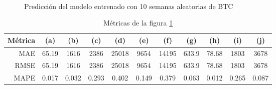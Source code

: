 \documentclass[a4paper,10pt]{article}
\begin{document}
\begin{figure}[h!]
    \\
  \caption{Predicción del modelo entrenado con 10 semanas aleatorias de BTC}
  \label{f:btc_wk_prophet}
\end{figure}

\begin{table}[h!]
 \begin{center}
  \begin{tabular}{|r|c|c|c|c|c|c|c|c|c|c|}
    Métrica & (a) & (b) & (c) & (d) & (e) & (f) & (g) & (h) & (i) & (j) \\ \hline
    MAE & 65.19 & 1616 & 2386 & 25018 & 9654 & 14195 & 633.9 & 78.68 & 1803 & 3678 \\
    RMSE & 65.19 & 1616 & 2386 & 25018 & 9654 & 14195 & 633.9 & 78.68 & 1803 & 3678 \\
    MAPE & 0.017 & 0.032 & 0.293 & 0.402 & 0.149 & 0.379 & 0.063 & 0.012 & 0.265 & 0.087 \\ \hline
  \end{tabular}
  \caption{Métricas de la figura \ref{f:btc_wk_prophet}}
  \label{tab:btc_prophet_wk}
 \end{center}
\end{table}
\end{document}
